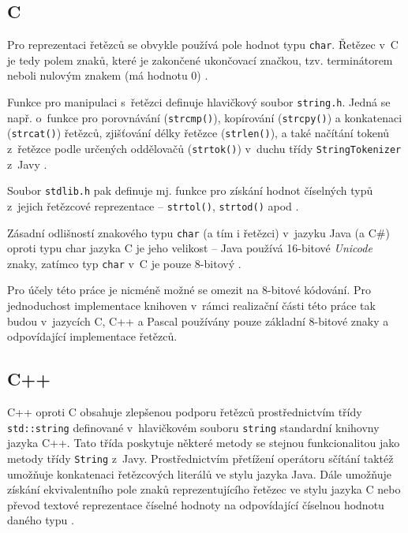\documentclass[onepage, a4paper, 12pt]{bakalarka}
\begin{document}
\subsection{C}
Pro reprezentaci řetězců se obvykle používá pole hodnot typu \texttt{char}. Řetězec v~C je tedy polem znaků, které je zakončené ukončovací značkou, tzv. terminátorem neboli nulovým znakem (má hodnotu 0) \cite{cpp-guide-chararray}.\par
Funkce pro manipulaci s~řetězci definuje hlavičkový soubor \texttt{string.h}. Jedná se např. o~funkce pro porovnávání (\texttt{strcmp()}), kopírování (\texttt{strcpy()}) a konkatenaci (\texttt{strcat()}) řetězců, zjišťování délky řetězce (\texttt{strlen()}), a také načítání tokenů z~řetězce podle určených oddělovačů (\texttt{strtok()}) v~duchu třídy \texttt{StringTokenizer} z~Javy \cite{cpp-guide-cstring}.\par
Soubor \texttt{stdlib.h} pak definuje mj. funkce pro získání hodnot číselných typů z~jejich řetězcové reprezentace -- \texttt{strtol()}, \texttt{strtod()} apod \cite{cpp-guide-cstdlib}.\par
Zásadní odlišností znakového typu \texttt{char} (a tím i řetězci) v~jazyku Java (a C\#) oproti typu char jazyka C je jeho velikost -- Java používá 16-bitové \textit{Unicode} znaky, zatímco typ \texttt{char} v~C je pouze 8-bitový \cite{cpp-guide-types}.\par
Pro účely této práce je nicméně možné se omezit na 8-bitové kódování. Pro jednoduchost implementace knihoven v~rámci realizační části této práce tak budou v~jazycích C, C++ a Pascal používány pouze základní 8-bitové znaky a odpovídající implementace řetězců.

\subsection{C++}
C++ oproti C obsahuje zlepšenou podporu řetězců prostřednictvím třídy \texttt{std::string} definované v~hlavičkovém souboru \texttt{string} standardní knihovny jazyka C++. Tato třída poskytuje některé metody se stejnou funkcionalitou jako metody třídy \texttt{String} z~Javy. Prostřednictvím přetížení operátoru sčítání taktéž umožňuje konkatenaci řetězcových literálů ve stylu jazyka Java. Dále umožňuje získání ekvivalentního pole znaků reprezentujícího řetězec ve stylu jazyka C nebo převod textové reprezentace číselné hodnoty na odpovídající číselnou hodnotu daného typu \cite{cpp-guide-string, cpp-guide-stdstring}.
\end{document}
